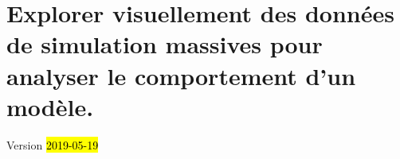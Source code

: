 \chapter{Explorer visuellement des données de simulation massives pour analyser le comportement d'un modèle.}
\label{chap:chap5}
\begin{center}
{\large Version \hl{2019-05-19}}

\end{center}
\setcounter{minitocdepth}{2}
\minitoc

\setcounter{section}{0}

%
\setcounter{section}{0}

%
\setcounter{section}{1}

%
\setcounter{section}{2}

%
\setcounter{section}{3}

%
\setcounter{section}{4}



